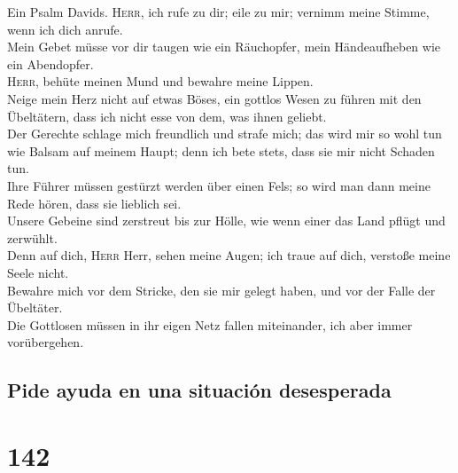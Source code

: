  Ein Psalm Davids. \textsc{Herr}, ich rufe zu dir; eile zu
mir; vernimm meine Stimme, wenn ich dich anrufe.\\
 Mein Gebet müsse vor dir taugen wie ein Räuchopfer, mein
Händeaufheben wie ein Abendopfer.\\
 \textsc{Herr}, behüte meinen Mund und bewahre meine
Lippen.\\
 Neige mein Herz nicht auf etwas Böses, ein gottlos Wesen
zu führen mit den Übeltätern, dass ich nicht esse von dem, was ihnen
geliebt.\\
 Der Gerechte schlage mich freundlich und strafe mich; das
wird mir so wohl tun wie Balsam auf meinem Haupt; denn ich bete stets,
dass sie mir nicht Schaden tun.\\
 Ihre Führer müssen gestürzt werden über einen Fels; so
wird man dann meine Rede hören, dass sie lieblich sei.\\
 Unsere Gebeine sind zerstreut bis zur Hölle, wie wenn
einer das Land pflügt und zerwühlt.\\
 Denn auf dich, \textsc{Herr} Herr, sehen meine Augen; ich
traue auf dich, verstoße meine Seele nicht.\\
 Bewahre mich vor dem Stricke, den sie mir gelegt haben,
und vor der Falle der Übeltäter.\\
 Die Gottlosen müssen in ihr eigen Netz fallen
miteinander, ich aber immer vorübergehen.

\hypertarget{pide-ayuda-en-una-situaciuxf3n-desesperada}{%
\subsection{Pide ayuda en una situación
desesperada}\label{pide-ayuda-en-una-situaciuxf3n-desesperada}}

\hypertarget{section-141}{%
\section{142}\label{section-141}}

